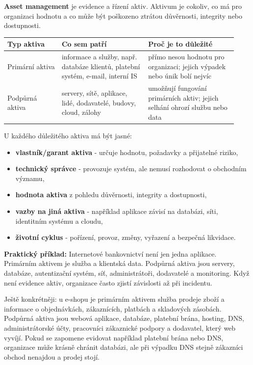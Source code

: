 \documentclass[11pt,a4paper]{article}
\newcommand{\itpr}[1]{\medskip\noindent\colorbox{green!8}{\parbox{\dimexpr\linewidth-2\fboxsep}{#1}}\medskip}
\begin{document}
\textbf{Asset management} je evidence a řízení aktiv. Aktivum je cokoliv, co má pro organizaci hodnotu a co může být poškozeno ztrátou důvěrnosti, integrity nebo dostupnosti.

\begin{longtable}{p{0.22\linewidth}p{0.35\linewidth}p{0.36\linewidth}}
\toprule
\textbf{Typ aktiva} & \textbf{Co sem patří} & \textbf{Proč je to důležité} \\
\midrule\endhead
Primární aktiva & informace a služby, např. databáze klientů, platební systém, e-mail, interní IS & přímo nesou hodnotu pro organizaci; jejich výpadek nebo únik bolí nejvíc \\
\addlinespace
Podpůrná aktiva & servery, sítě, aplikace, lidé, dodavatelé, budovy, cloud, zálohy & umožňují fungování primárních aktiv; jejich selhání ohrozí službu nebo data \\
\bottomrule
\end{longtable}

U každého důležitého aktiva má být jasné:
\begin{itemize}
    \item \textbf{vlastník/garant aktiva} - určuje hodnotu, požadavky a přijatelné riziko,
    \item \textbf{technický správce} - provozuje systém, ale nemusí rozhodovat o obchodním významu,
    \item \textbf{hodnota aktiva} z pohledu důvěrnosti, integrity a dostupnosti,
    \item \textbf{vazby na jiná aktiva} - například aplikace závisí na databázi, síti, identitním systému a cloudu,
    \item \textbf{životní cyklus} - pořízení, provoz, změny, vyřazení a bezpečná likvidace.
\end{itemize}

\itpr{\textbf{Praktický příklad:} Internetové bankovnictví není jen jedna aplikace. Primárním aktivem je služba a klientská data. Podpůrná aktiva jsou servery, databáze, autentizační systém, síť, administrátoři, dodavatelé a monitoring. Když není evidence aktiv, organizace často zjistí závislosti až při incidentu.}

Ještě konkrétněji: u e-shopu je primárním aktivem služba prodeje zboží a informace o objednávkách, zákaznících, platbách a skladových zásobách. Podpůrná aktiva jsou webová aplikace, databáze, platební brána, hosting, DNS, administrátorské účty, pracovníci zákaznické podpory a dodavatel, který web vyvíjí. Pokud se zapomene evidovat například platební brána nebo DNS, organizace může krásně chránit databázi, ale při výpadku DNS stejně zákazníci obchod nenajdou a prodej stojí.
\end{document}
